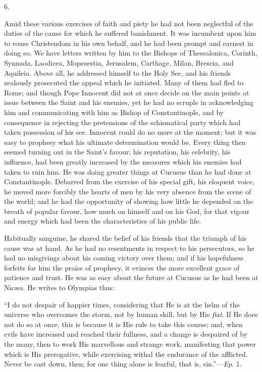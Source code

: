 6.

Amid these various exercises of faith and piety he had not been
neglectful of the duties of the cause for which he suffered
banishment. It was incumbent upon him to rouse Christendom in his own
behalf, and he had been prompt and earnest in doing so. We have
letters written by him to the Bishops of Thessalonica, Corinth,
Synnada, Laodicea, Mopsuestia, Jerusalem, Carthage, Milan, Brescia,
and Aquileia. Above all, he addressed himself to the Holy See, and his
friends zealously prosecuted the appeal which he initiated. Many of
them had fled to Rome; and though Pope Innocent did not at once decide
on the main points at issue between the Saint and his enemies, yet he
had no scruple in acknowledging him and communicating with him as
Bishop of Constantinople, and by consequence in rejecting the
pretensions of the schismatical party which had taken possession of
his see. Innocent could do no more at the moment; but it was easy to
prophesy what his ultimate determination would be. Every thing then
seemed turning out in the Saint's favour; his reputation, his
celebrity, his influence, had been greatly increased by the measures
which his enemies had taken to ruin him. He was doing greater
things at Cucusus than he had done at Constantinople. Debarred from
the exercise of his special gift, his eloquent voice, he moved more
forcibly the hearts of men by his very absence from the scene of the
world; and he had the opportunity of showing how little he depended on
the breath of popular favour, how much on himself and on his God, for
that vigour and energy which had been the characteristics of his
public life.

Habitually sanguine, he shared the belief of his friends that the
triumph of his cause was at hand. As he had no resentments in respect
to his persecutors, so he had no misgivings about his coming victory
over them; and if his hopefulness forfeits for him the praise of
prophecy, it evinces the more excellent grace of patience and trust.
He was as easy about the future at Cucusus as he had been at Nicæa.
He writes to Olympias thus:

``I do not despair of happier times, considering that He is at
the helm of the universe who overcomes the storm, not by human skill,
but by His \emph{fiat}. If He does not do so at once, this is because
it is His rule to take this course; and, when evils have increased and
reached their fullness, and a change is despaired of by the many, then
to work His marvellous and strange work, manifesting that power which
is His prerogative, while exercising withal the endurance of the
afflicted. Never be cast down, then; for one thing alone is fearful,
that is, sin.''—\emph{Ep}. 1.

